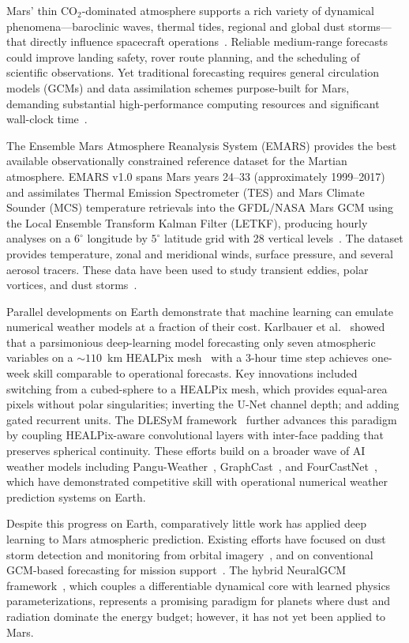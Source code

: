 \documentclass[11pt, a4paper, twocolumn]{article}
\begin{document}
Mars' thin CO$_2$-dominated atmosphere supports a rich variety of dynamical phenomena---baroclinic waves, thermal tides, regional and global dust storms---that directly influence spacecraft operations~\cite{read2015physics}. Reliable medium-range forecasts could improve landing safety, rover route planning, and the scheduling of scientific observations. Yet traditional forecasting requires general circulation models (GCMs) and data assimilation schemes purpose-built for Mars, demanding substantial high-performance computing resources and significant wall-clock time~\cite{haberle2019}.

The Ensemble Mars Atmosphere Reanalysis System (EMARS) provides the best available observationally constrained reference dataset for the Martian atmosphere. EMARS v1.0 spans Mars years 24--33 (approximately 1999--2017) and assimilates Thermal Emission Spectrometer (TES) and Mars Climate Sounder (MCS) temperature retrievals into the GFDL/NASA Mars GCM using the Local Ensemble Transform Kalman Filter (LETKF), producing hourly analyses on a $6^\circ$ longitude by $5^\circ$ latitude grid with 28 vertical levels~\cite{greybush2019}. The dataset provides temperature, zonal and meridional winds, surface pressure, and several aerosol tracers. These data have been used to study transient eddies, polar vortices, and dust storms~\cite{greybush2012ensemble}.

Parallel developments on Earth demonstrate that machine learning can emulate numerical weather models at a fraction of their cost. Karlbauer et al.~\cite{karlbauer2024} showed that a parsimonious deep-learning model forecasting only seven atmospheric variables on a ${\sim}110$~km HEALPix mesh~\cite{gorski2005healpix} with a 3-hour time step achieves one-week skill comparable to operational forecasts. Key innovations included switching from a cubed-sphere to a HEALPix mesh, which provides equal-area pixels without polar singularities; inverting the U-Net channel depth; and adding gated recurrent units. The DLESyM framework~\cite{wattmeyer2024} further advances this paradigm by coupling HEALPix-aware convolutional layers with inter-face padding that preserves spherical continuity. These efforts build on a broader wave of AI weather models including Pangu-Weather~\cite{bi2023pangu}, GraphCast~\cite{lam2023graphcast}, and FourCastNet~\cite{pathak2022fourcastnet}, which have demonstrated competitive skill with operational numerical weather prediction systems on Earth.

Despite this progress on Earth, comparatively little work has applied deep learning to Mars atmospheric prediction. Existing efforts have focused on dust storm detection and monitoring from orbital imagery~\cite{battalio2021,rodriguez2023}, and on conventional GCM-based forecasting for mission support~\cite{newman2021}. The hybrid NeuralGCM framework~\cite{kochkov2024neuralgcm}, which couples a differentiable dynamical core with learned physics parameterizations, represents a promising paradigm for planets where dust and radiation dominate the energy budget; however, it has not yet been applied to Mars.
\end{document}
